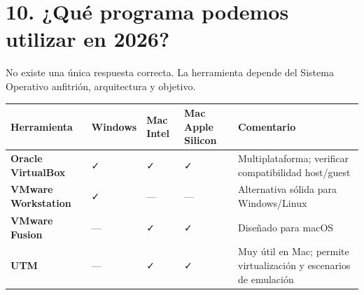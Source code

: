 \documentclass[
  spanish,
  letterpaper,
]{scrbook}
\newcounter{none} %
\begin{document}

\chapter{10. ¿Qué programa podemos utilizar en
2026?}\label{quuxe9-programa-podemos-utilizar-en-2026}

No existe una única respuesta correcta. La herramienta depende del
Sistema Operativo anfitrión, arquitectura y objetivo.

{\def\LTcaptype{none} %
\begin{longtable}[]{@{}
  >{\raggedright\arraybackslash}p{}
  >{\centering\arraybackslash}p{}
  >{\centering\arraybackslash}p{}
  >{\centering\arraybackslash}p{}
  >{\raggedright\arraybackslash}p{}@{}}
\toprule\noalign{}
\begin{minipage}[b]{\linewidth}\raggedright
Herramienta
\end{minipage} & \begin{minipage}[b]{\linewidth}\centering
Windows
\end{minipage} & \begin{minipage}[b]{\linewidth}\centering
Mac Intel
\end{minipage} & \begin{minipage}[b]{\linewidth}\centering
Mac Apple Silicon
\end{minipage} & \begin{minipage}[b]{\linewidth}\raggedright
Comentario
\end{minipage} \\
\midrule\noalign{}
\endhead
\bottomrule\noalign{}
\endlastfoot
\textbf{Oracle VirtualBox} & ✓ & ✓ & ✓ & Multiplataforma; verificar
compatibilidad host/guest \\
\textbf{VMware Workstation} & ✓ & --- & --- & Alternativa sólida para
Windows/Linux \\
\textbf{VMware Fusion} & --- & ✓ & ✓ & Diseñado para macOS \\
\textbf{UTM} & --- & ✓ & ✓ & Muy útil en Mac; permite virtualización y
escenarios de emulación \\
\end{longtable}
}
\end{document}
